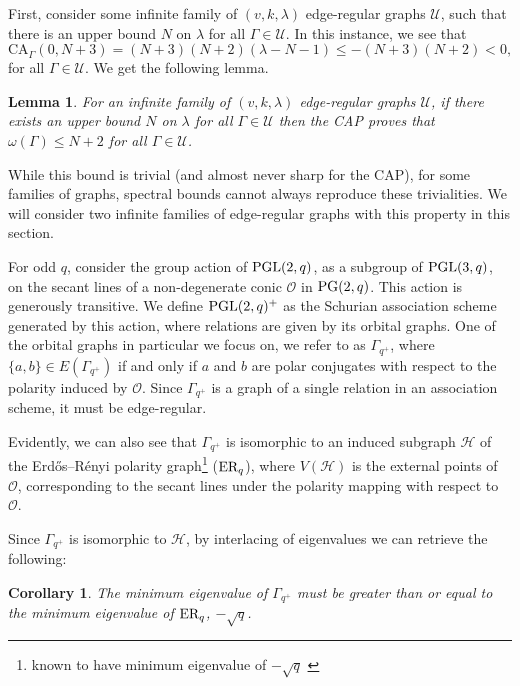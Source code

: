 \documentclass[11pt, baustms]{amsproc}
\theoremstyle{scplain}
\newtheorem{lemma}[theorem]{Lemma}
\newtheorem{corollary}[theorem]{Corollary}
\newcommand\CA{\mathrm{CA}}
\renewcommand\le{\leqslant}
\begin{document}
 First, consider some infinite family of $(v,k,\lambda)$ edge-regular graphs $\mathcal{U}$, such that there is an upper bound $N$ on $\lambda$ for all $\Gamma \in \mathcal{U}$. In this instance, we see that
        \[
        \CA_\Gamma(0,N+3)=(N+3)(N+2)(\lambda-N-1)\le -(N+3)(N+2)< 0,
        \]
for all $\Gamma \in \mathcal U$. We get the following lemma.

\begin{lemma}
\label{trivial}
For an infinite family of $(v,k,\lambda)$ edge-regular graphs $\mathcal{U}$, if there exists an upper bound $N$ on $\lambda$ for all $\Gamma \in \mathcal{U}$ then the CAP proves that $\omega(\Gamma) \le N+2$ for all $\Gamma \in \mathcal{U}$.  
\end{lemma}

While this bound is trivial (and almost never sharp for the CAP), for some families of graphs, spectral bounds cannot always reproduce these trivialities. We will consider two infinite families of edge-regular graphs with this property in this section.

For odd $q$, consider the group action of $\textnormal{PGL}(2, q)$, as a subgroup of $\textnormal{PGL}(3, q)$, on the secant lines of a non-degenerate conic  $\mathcal{O}$ in $\textnormal{PG}(2,q)$. This action is generously transitive. We define $\textnormal{PGL}(2,q)^+$ as the Schurian association scheme generated by this action, where relations are given by its orbital graphs. One of the orbital graphs in particular we focus on, we refer to as $\Gamma_{q^+}$, where $\{a,b\} \in E(\Gamma_{q^+})$ if and only if $a$ and $b$ are polar conjugates with respect to the polarity induced by $\mathcal{O}$. Since $\Gamma_{q^+}$ is a graph of a single relation in an association scheme, it must be edge-regular.

Evidently, we can also see that $\Gamma_{q^+}$ is isomorphic to an induced subgraph $\mathcal{H}$ of the Erd\H{o}s–R\'enyi polarity graph\footnote{known to have minimum eigenvalue of $-\sqrt{q}$ \cite{erpg}} ($\textnormal{ER}_q$), where $V(\mathcal{H})$ is the external points of $\mathcal{O}$, corresponding to the secant lines under the polarity mapping with respect to $\mathcal{O}$.

Since $\Gamma_{q^+}$ is isomorphic to $\mathcal{H}$, by interlacing of eigenvalues we can retrieve the following:
	\begin{corollary}
		\label{minev}
		The minimum eigenvalue of $\Gamma_{q^+}$ must be greater than or equal to the minimum eigenvalue of $\textnormal{ER}_q$, $-\sqrt{q}$.
	\end{corollary}
\end{document}
